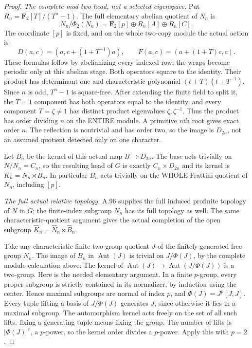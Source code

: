 \begin{proof}
\emph{The complete mod-two head, not a selected eigenspace.}
Put $R_n=\mathbf F_2[T]/(T^n-1)$. The full elementary abelian quotient
of $N_n$ is
\[
 N_n/\Phi_2(N_n)
   =\mathbf F_2[p]\oplus R_n[A]\oplus R_n[C].
\]
The coordinate $[p]$ is fixed, and on the whole two-copy module the
actual action is
\begin{equation}\label{eq:A102-linear}
 D(a,c)=(a,c+(1+T^{-1})a),\qquad
 F(a,c)=(a+(1+T)c,c).
\end{equation}
These formulas follow by abelianizing every indexed row; the wraps
become periodic only at this abelian stage. Both operators square to
the identity. Their product has determinant one and characteristic
polynomial $(t+T)(t+T^{-1})$. Since $n$ is odd, $T^n-1$ is square-free.
After extending the finite field to split it, the $T=1$ component has
both operators equal to the identity, and every component $T=\zeta\ne1$
has distinct product eigenvalues $\zeta,\zeta^{-1}$. Thus the product
has order dividing $n$ on the ENTIRE module. A primitive $n$th root
gives exact order $n$. The reflection is nontrivial and has order two,
so the image is $D_{2n}$, not an assumed quotient detected only on one
character.

Let $B_n$ be the kernel of this actual map $B\to D_{2n}$. The base
acts trivially on $N/N_n=C_n$, so the resulting head of $G$ is exactly
$C_n\times D_{2n}$ and its kernel is
$K_n=N_n\rtimes B_n$. In particular $B_n$ acts trivially on the WHOLE
Frattini quotient of $N_n$, including $[p]$.

\emph{The full actual relative topology.}
A.96 supplies the full induced profinite topology of $N$ in $G$;
the finite-index subgroup $N_n$ has its full topology as well.
The same characteristic-quotient argument gives the actual completion
of the open subgroup
$\widehat K_n=\widehat N_n\rtimes\widehat B_n$.

Take any characteristic finite two-group quotient $J$ of the finitely
generated free group $N_n$. The image of $B_n$ in $\operatorname{Aut}(J)$
is trivial on $J/\Phi(J)$, by the complete module calculation above.
The kernel of
$\operatorname{Aut}(J)\to\operatorname{Aut}(J/\Phi(J))$ is a two-group.
Here is the needed elementary argument. In a finite $p$-group,
every proper subgroup is strictly contained in its normalizer, by
induction using the center. Hence maximal subgroups are normal of
index $p$, and $\Phi(J)=J^p[J,J]$. Every tuple lifting a basis of
$J/\Phi(J)$ generates $J$, since otherwise it lies in a maximal
subgroup. The automorphism kernel acts freely on the set of all such
lifts: fixing a generating tuple means fixing the group. The number
of lifts is $|\Phi(J)|^r$, a $p$-power, so the kernel order divides
a $p$-power. Apply this with $p=2$.


\end{proof}
